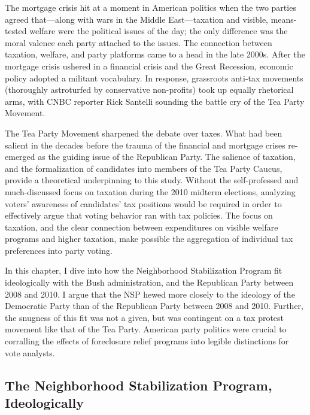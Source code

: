 \documentclass[
]{article}
\begin{document}
The mortgage crisis hit at a moment in American politics when the two
parties agreed that---along with wars in the Middle East---taxation and
visible, means-tested welfare were the political issues of the day; the
only difference was the moral valence each party attached to the issues.
The connection between taxation, welfare, and party platforms came to a
head in the late 2000s. After the mortgage crisis ushered in a financial
crisis and the Great Recession, economic policy adopted a militant
vocabulary. In response, grassroots anti-tax movements (thoroughly
astroturfed by conservative non-profits) took up equally rhetorical
arms, with CNBC reporter Rick Santelli sounding the battle cry of the
Tea Party Movement.

The Tea Party Movement sharpened the debate over taxes. What had been
salient in the decades before the trauma of the financial and mortgage
crises re-emerged as the guiding issue of the Republican Party. The
salience of taxation, and the formalization of candidates into members
of the Tea Party Caucus, provide a theoretical underpinning to this
study. Without the self-professed and much-discussed focus on taxation
during the 2010 midterm elections, analyzing voters' awareness of
candidates' tax positions would be required in order to effectively
argue that voting behavior ran with tax policies. The focus on taxation,
and the clear connection between expenditures on visible welfare
programs and higher taxation, make possible the aggregation of
individual tax preferences into party voting.

In this chapter, I dive into how the Neighborhood Stabilization Program
fit ideologically with the Bush administration, and the Republican Party
between 2008 and 2010. I argue that the NSP hewed more closely to the
ideology of the Democratic Party than of the Republican Party between
2008 and 2010. Further, the snugness of this fit was not a given, but
was contingent on a tax protest movement like that of the Tea Party.
American party politics were crucial to corralling the effects of
foreclosure relief programs into legible distinctions for vote analysts.

\hypertarget{the-neighborhood-stabilization-program-ideologically}{%
\subsection{The Neighborhood Stabilization Program,
Ideologically}\label{the-neighborhood-stabilization-program-ideologically}}
\end{document}
